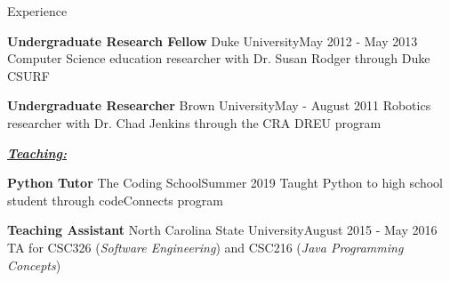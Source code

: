 \documentclass{resume} %
\begin{document}
\begin{rSection}{Experience}
\begin{eSubsection}{\textbf{Undergraduate Research Fellow} Duke University}{May 2012 - May 2013}
{Computer Science education researcher with Dr. Susan Rodger through Duke CSURF}
\end{eSubsection}
\vspace{-7pt}

\begin{eSubsection}{\textbf{Undergraduate Researcher} Brown University}{May - August 2011}
{Robotics researcher with Dr. Chad Jenkins through the CRA DREU program}
\end{eSubsection}
\vspace{-5pt}

\underline{\textbf{\textit{Teaching:}}}
\vspace{-7pt}

\begin{eSubsection}{\textbf{Python Tutor} The Coding School}{Summer 2019}
{Taught Python to high school student through codeConnects program}
\end{eSubsection}
\vspace{-7pt}

\begin{eSubsection}{\textbf{Teaching Assistant} North Carolina State University}{August 2015 - May 2016}
{TA for CSC326 (\textit{Software Engineering}) and CSC216 (\textit{Java Programming Concepts})}
\end{eSubsection}
\vspace{-27pt}
\end{rSection}
\end{document}
